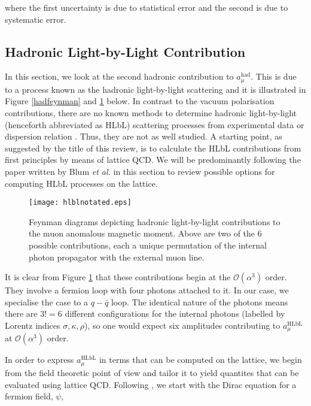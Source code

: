 \documentclass{article}
\numberwithin{equation}{section} %
\begin{document}
\noindent where the first uncertainty is due to statistical error and the second is due to systematic error. 



\subsection{Hadronic Light-by-Light Contribution}

In this section, we look at the second hadronic contribution to $a_\mu^\mathrm{had}$. This is due to a process known as the hadronic light-by-light scattering and it is illustrated in Figure \ref{hadfeynman} and \ref{hadlbl} below. In contrast to the vacuum polarisation contributions, there are no known methods to determine hadronic light-by-light (henceforth abbreviated as HLbL) scattering processes from experimental data or dispersion relation \cite{blum}. Thus, they are not as well studied. A starting point, as suggested by the title of this review, is to calculate the HLbL contributions from first principles by means of lattice QCD. We will be predominantly following the paper written by Blum \textit{et al.}\cite{blum} in this section to review possible options for computing HLbL processes on the lattice.

\begin{figure}[t]
    \centering
    \texttt{[image: hlblnotated.eps]}%
    \caption{Feynman diagrams depicting hadronic light-by-light contributions to the muon anomalous magnetic moment. Above are two of the 6 possible contributions, each a unique permutation of the internal photon propagator with the external muon line.}%
    \label{hadlbl}%
\end{figure}


It is clear from Figure \ref{hadlbl} that these contributions begin at the $\mathcal{O}(\alpha^3)$ order. They involve a fermion loop with four photons attached to it\cite{lehnerg2}. In our case, we specialise the case to a $q-\bar{q}$ loop. The identical nature of the photons means there are $3!=6$ different configurations for the internal photons (labelled by Lorentz indices $\sigma, \kappa, \rho$), so one would expect six amplitudes contributing to $a_\mu^\mathrm{HLbL}$ at $\mathcal{O}(\alpha^3)$ order.

In order to express $a_\mu^\mathrm{HLbL}$ in terms that can be computed on the lattice, we begin from the field theoretic point of view and tailor it to yield quantites that can be evaluated using lattice QCD. Following \cite{zee}, we start with the Dirac equation for a fermion field, $\psi$,
\end{document}
